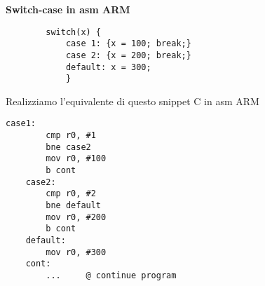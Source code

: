 \begin{defn}
	\textbf{Switch-case in asm ARM}

	\begin{lstlisting}
		switch(x) {
			case 1: {x = 100; break;}
			case 2: {x = 200; break;}
			default: x = 300;
			}
	\end{lstlisting}

	Realizziamo l'equivalente di questo snippet C in asm ARM

	\begin{lstlisting}[style=armn]
	case1:
		cmp r0, #1
		bne case2
		mov r0, #100
		b cont
	case2:
		cmp r0, #2
		bne default
		mov r0, #200
		b cont
	default:
		mov r0, #300
	cont:
		... 	@ continue program
	\end{lstlisting}
\end{defn}